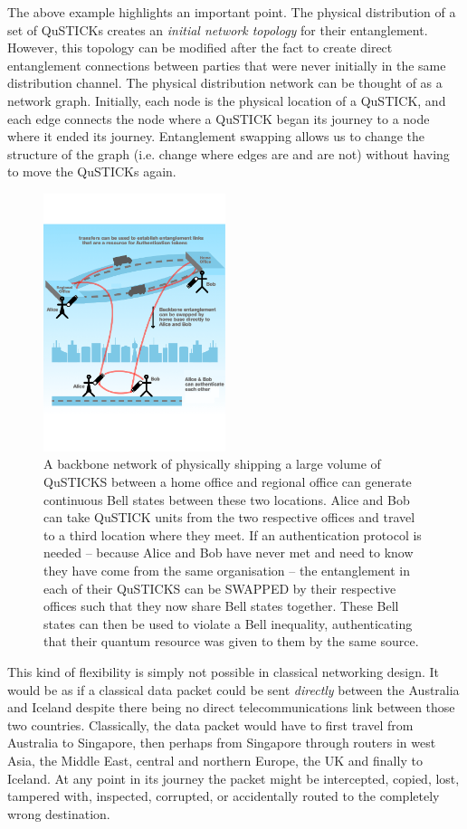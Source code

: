 \documentclass[twocolumn, aps, rmp, amsmath, amssymb, nofootinbib, superscriptaddress, longbibliography, floatfix, table-of-contents, eqsecnum]{revtex4-2}
\begin{document}
The above example highlights an important point. The physical distribution of a set of QuSTICKs creates an \textit{initial network topology} for their entanglement. However, this topology can be modified after the fact to create direct entanglement connections between parties that were never initially in the same distribution channel. The physical distribution network can be thought of as a network graph. Initially, each node is the physical location of a QuSTICK, and each edge connects the node where a QuSTICK began its journey to a node where it ended its journey. Entanglement swapping allows us to change the structure of the graph (i.e. change where edges are and are not) without having to move the QuSTICKs again. 
 
\begin{figure}[htbp!]
	\includegraphics[clip=true, width=0.475\textwidth]{SWAPPING}
	\caption{A backbone network of physically shipping a large volume of QuSTICKS between a home office and regional office can generate continuous Bell states between these two locations.  Alice and Bob can take QuSTICK units from the two respective offices and travel to a third location where they meet.  If an authentication protocol is needed -- because Alice and Bob have never met and need to know they have come from the same organisation -- the entanglement in each of their QuSTICKS can be SWAPPED by their respective offices such that they now share Bell states together.  These Bell states can then be used to violate a Bell inequality, authenticating that their quantum resource was given to them by the same source.} \label{fig:SWAPPING}
\end{figure}

This kind of flexibility is simply not possible in classical networking design. It would be as if a classical data packet could be sent \textit{directly} between the Australia and Iceland despite there being no direct telecommunications link between those two countries. Classically, the data packet would have to first travel from Australia to Singapore, then perhaps from Singapore through routers in west Asia, the Middle East, central and northern Europe, the UK and finally to Iceland. At any point in its journey the packet might be intercepted, copied, lost, tampered with, inspected, corrupted, or accidentally routed to the completely wrong destination. 
\end{document}
